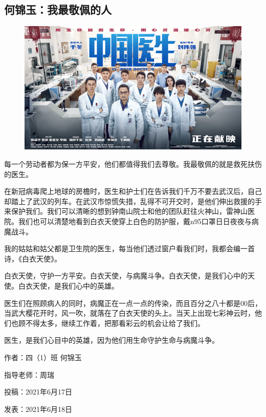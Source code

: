 \vspace{10pt}

{\centering\subsection*{何锦玉：我最敬佩的人}}


\renewcommand{\leftmark}{何锦玉：我最敬佩的人}

\begin{figure}[htbp]

\centering

\includegraphics[width = .5\textwidth]{./ch/1.jpg}

\end{figure}





每一个劳动者都为保一方平安，他们都值得我们去尊敬。我最敬佩的就是救死扶伤的医生。



在新冠病毒爬上地球的房檐时，医生和护士们在告诉我们千万不要去武汉后，自己却踏上了武汉的列车。在武汉市惊慌失措，乱得不可开交时，是他们伸出救援的手来保护我们。我们可以清晰的想到钟南山院士和他的团队赶往火神山，雷神山医院。我们也可以清楚地看到白衣天使穿上白色的防护服，戴n95口罩日日夜夜与病魔战斗。

我的姑姑和姑父都是卫生院的医生，每当他们透过窗户看我们时，我都会编一首诗，《白衣天使》。

白衣天使，守护一方平安。白衣天使，与病魔斗争。白衣天使，是我们心中的天使。白衣天使，是我们心中的英雄。

医生们在照顾病人的同时，病魔正在一点一点的传染，而且百分之八十都是00后，当武大樱花开时，风一吹，就落在了白衣天使的头上。当天上出现七彩神云时，他们也顾不得太多，继续工作着，把那看彩云的机会让给了我们。

医生，是我们心目中的英雄，因为他们用生命守护生命与病魔斗争。





\vspace{10pt}



作者：四（1）班 何锦玉



指导老师：周瑞



投稿：2021年6月17日



发表：2021年6月18日










                



\vspace{10pt}

\hline



